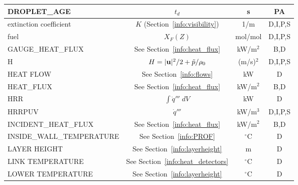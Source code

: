 \documentclass[11pt]{book}
\newcommand{\bu}{{\bf u}}
\newcommand{\tp}{\tilde{p}}
\newcommand{\dq}{\dot{q}}
\begin{document}
\begin{table}[h!]
\begin{center}
\begin{tabular}{|l|c|c|c|}
{\ct DROPLET\_AGE}                              & $t_d$                                         & s              & PA           \\ \hline
{\ct extinction coefficient}                    & $K$ (Section~\ref{info:visibility})           & 1/m            & D,I,P,S      \\ \hline
{\ct fuel}                                      & $X_F(Z)$                                      & mol/mol        & D,I,P,S      \\ \hline
{\ct GAUGE\_HEAT\_FLUX}                         & See Section~\ref{info:heat_flux}              & kW/m$^2$       & B,D          \\ \hline
{\ct H}                                         & $H=|\bu|^2/2 + \tp/\rho_0$                    & (m/s)$^2$      & D,I,P,S      \\ \hline
{\ct HEAT FLOW}                                 & See Section~\ref{info:flows}                  & kW             & D            \\ \hline
{\ct HEAT\_FLUX}                                & See Section~\ref{info:heat_flux}              & kW/m$^2$       & B,D          \\ \hline
{\ct HRR}                                       & $\int \dq''' \; dV$                           & kW             & D            \\ \hline
{\ct HRRPUV}                                    & $\dq'''$                                      & kW/m$^3$       & D,I,P,S      \\ \hline
{\ct INCIDENT\_HEAT\_FLUX}                      & See Section~\ref{info:heat_flux}              & kW/m$^2$       & B,D          \\ \hline
{\ct INSIDE\_WALL\_TEMPERATURE}                 & See Section~\ref{info:PROF}                   & $^\circ$C      & D            \\ \hline
{\ct LAYER HEIGHT}                              & See Section~\ref{info:layerheight}            & m              & D            \\ \hline
{\ct LINK TEMPERATURE}                          & See Section~\ref{info:heat_detectors}         & $^\circ$C      & D            \\ \hline
{\ct LOWER TEMPERATURE}                         & See Section~\ref{info:layerheight}            & $^\circ$C      & D            \\ \hline
\end{tabular}
\label{tab:output}
\end{center}
\end{table}
\end{document}

